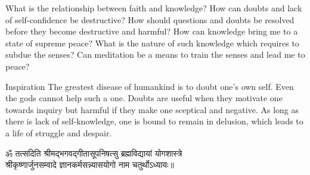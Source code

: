 
\newpage
\begin{mananam}{} 
\mananamtext What is the relationship between faith and knowledge? How can doubts and lack of self-confidence be destructive? How should questions and doubts be resolved before they become destructive and harmful? 
How can knowledge bring me to a state of supreme peace? What is the nature of such knowledge which requires to subdue the senses? Can meditation be a means to train the senses and lead me to peace?
\end{mananam}
\WritingHand{}
\begin{inspiration}{\mananamfont Inspiration}
\mananamtext The greatest disease of humankind is to doubt one’s own self. Even the gods cannot help such a one. Doubts are useful when they motivate one towards inquiry but harmful if they make one sceptical and negative. 
As long as there is lack of self-knowledge, one is bound to remain in delusion, which leads to a life of struggle and despair. 
\end{inspiration}

\newpage
\begin{center}
  {\devfont ॐ तत्सदिति श्रीमद्भगवद्गीतासूपनिषत्सु ब्रह्मविद्यायां योगशास्त्रे\\
  श्रीकृष्णार्जुनसम्वादे ज्ञानकर्मसन्न्यासयोगो नाम चतुर्थोऽध्यायः॥\\}
\end{center}

